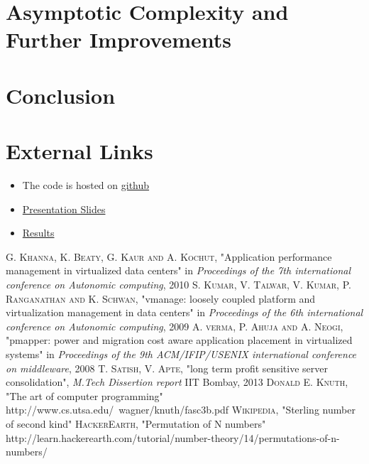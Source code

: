 \documentclass[a4paper,12pt]{article}
\begin{document}
\section{Asymptotic Complexity and Further Improvements}

\section{Conclusion}

\section{External Links}
\begin{itemize}
\item The code is hosted on  \href{https://github.com/mangalaman93/simcon}{github}
\item \href{https://docs.google.com/presentation/d/1o9QjOCgkjpc1pTfe9yfQ9EgXF5nRbf4Yh9lMTVCrav4/edit#slide=id.g11d5b1618_0202}{Presentation Slides}
\item \href{https://docs.google.com/spreadsheet/ccc?key=0Aoq3-tdSgQ83dGEzakJoUk9pYjlmSXVNN3p1bGtwLWc&usp=drive_web#gid=0}{Results}
\end{itemize}

\begin{thebibliography}{9}
    \textsc{G. Khanna, K. Beaty, G. Kaur and A. Kochut}, "Application performance management in virtualized data centers" in \textit{Proceedings of the 7th international conference on Autonomic computing}, 2010
    \textsc{S. Kumar, V. Talwar, V. Kumar, P. Ranganathan and K. Schwan}, "vmanage: loosely coupled platform and virtualization management in data centers" in \textit{Proceedings of the 6th international conference on Autonomic computing}, 2009
    \textsc{A. verma, P. Ahuja and A. Neogi}, "pmapper: power and migration cost aware application placement in virtualized systems" in \textit{Proceedings of the 9th ACM/IFIP/USENIX international conference on middleware}, 2008
    \textsc{T. Satish, V. Apte}, "long term profit sensitive server consolidation", \textit{M.Tech Dissertion report} IIT Bombay, 2013
    \textsc{Donald E. Knuth}, "The art of computer programming" http://www.cs.utsa.edu/~wagner/knuth/fasc3b.pdf
    \textsc{Wikipedia}, "Sterling number of second kind"
    \textsc{HackerEarth}, "Permutation of N numbers" http://learn.hackerearth.com/tutorial/number-theory/14/permutations-of-n-numbers/
\end{thebibliography}
\end{document}
